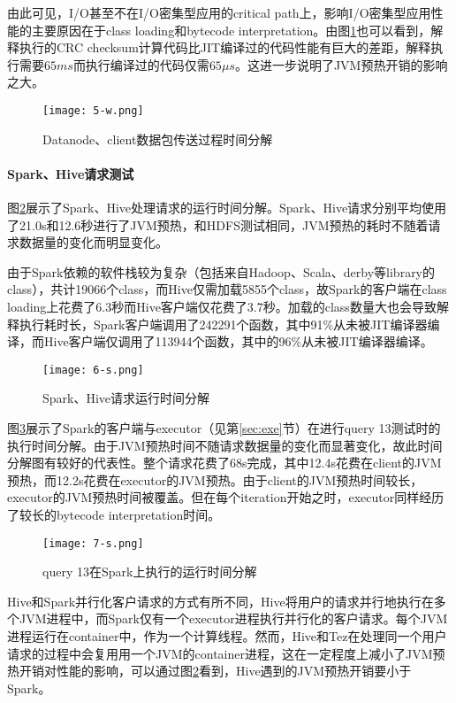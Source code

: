 \documentclass[lang=cn,12pt,a4paper,cite=authoryear]{elegantpaper}
\begin{document}
\begin{figure*}[!htp]
由此可见，I/O甚至不在I/O密集型应用的critical path上，影响I/O密集型应用性能的主要原因在于class loading和bytecode interpretation。由图\ref{fig:br1}也可以看到，解释执行的CRC checksum计算代码比JIT编译过的代码性能有巨大的差距，解释执行需要$65ms$而执行编译过的代码仅需$65\mu s$。这进一步说明了JVM预热开销的影响之大。

\begin{figure}[!htp]
  \centering
  \texttt{[image: 5-w.png]}
  \caption{Datanode、client数据包传送过程时间分解}
  \label{fig:br1}
\end{figure}

\paragraph{Spark、Hive请求测试}
图\ref{fig:br2}展示了Spark、Hive处理请求的运行时间分解。Spark、Hive请求分别平均使用了21.0s和12.6秒进行了JVM预热，和HDFS测试相同，JVM预热的耗时不随着请求数据量的变化而明显变化。

由于Spark依赖的软件栈较为复杂（包括来自Hadoop、Scala、derby等library的class），共计19066个class，而Hive仅需加载5855个class，故Spark的客户端在class loading上花费了6.3秒而Hive客户端仅花费了3.7秒。加载的class数量大也会导致解释执行耗时长，Spark客户端调用了242291个函数，其中91\%从未被JIT编译器编译，而Hive客户端仅调用了113944个函数，其中的96\%从未被JIT编译器编译。

\begin{figure}[!htp]
  \centering
  \texttt{[image: 6-s.png]}
  \caption{Spark、Hive请求运行时间分解}
  \label{fig:br2}
\end{figure}

图\ref{fig:br3}展示了Spark的客户端与executor（见第\ref{sec:exe}节）在进行query 13测试时的执行时间分解。由于JVM预热时间不随请求数据量的变化而显著变化，故此时间分解图有较好的代表性。整个请求花费了68s完成，其中12.4s花费在client的JVM预热，而12.2s花费在executor的JVM预热。由于client的JVM预热时间较长，executor的JVM预热时间被覆盖。但在每个iteration开始之时，executor同样经历了较长的bytecode interpretation时间。

\begin{figure}[!htp]
  \centering
  \texttt{[image: 7-s.png]}
  \caption{query 13在Spark上执行的运行时间分解}
  \label{fig:br3}
\end{figure}

Hive和Spark并行化客户请求的方式有所不同，Hive将用户的请求并行地执行在多个JVM进程中，而Spark仅有一个executor进程执行并行化的客户请求。每个JVM进程运行在container中，作为一个计算线程。然而，Hive和Tez在处理同一个用户请求的过程中会复用用一个JVM的container进程，这在一定程度上减小了JVM预热开销对性能的影响，可以通过图\ref{fig:br2}看到，Hive遇到的JVM预热开销要小于Spark。


\end{figure*}
\end{document}
